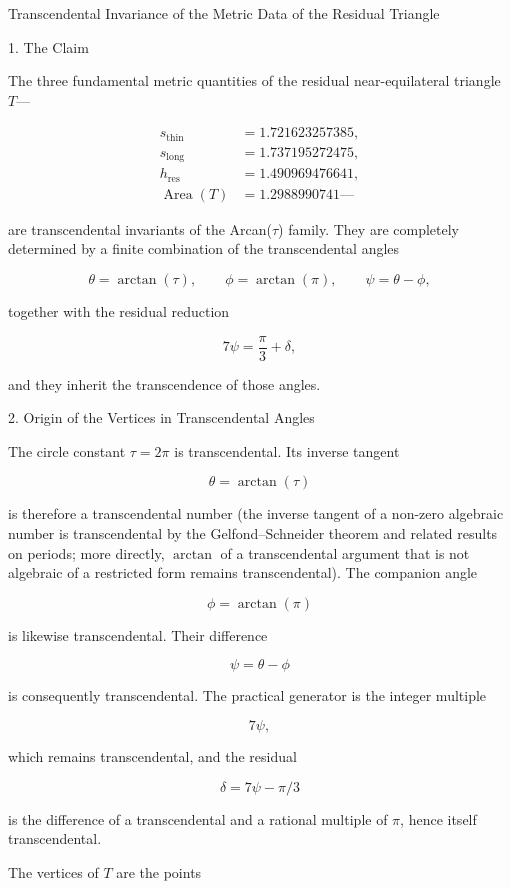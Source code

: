 Transcendental Invariance of the Metric Data of the Residual Triangle

1. The Claim

The three fundamental metric quantities of the residual near-equilateral triangle \(T\)—

\[
\begin{align*}
s_{\mathrm{thin}}&=1.721623257385,\\
s_{\mathrm{long}}&=1.737195272475,\\
h_{\mathrm{res}}&=1.490969476641,\\
\operatorname{Area}(T)&=1.2988990741—
\end{align*}
\]

are transcendental invariants of the Arcan(\(\tau\)) family. They are completely determined by a finite combination of the transcendental angles

\[
\theta=\arctan(\tau),\qquad
\phi=\arctan(\pi),\qquad
\psi=\theta-\phi,
\]

together with the residual reduction

\[
7\psi=\frac{\pi}{3}+\delta,
\]

and they inherit the transcendence of those angles.

2. Origin of the Vertices in Transcendental Angles

The circle constant \(\tau=2\pi\) is transcendental. Its inverse tangent

\[
\theta=\arctan(\tau)
\]

is therefore a transcendental number (the inverse tangent of a non-zero algebraic number is transcendental by the Gelfond–Schneider theorem and related results on periods; more directly, \(\arctan\) of a transcendental argument that is not algebraic of a restricted form remains transcendental). The companion angle

\[
\phi=\arctan(\pi)
\]

is likewise transcendental. Their difference

\[
\psi=\theta-\phi
\]

is consequently transcendental. The practical generator is the integer multiple

\[
7\psi,
\]

which remains transcendental, and the residual

\[
\delta=7\psi-\pi/3
\]

is the difference of a transcendental and a rational multiple of \(\pi\), hence itself transcendental.

The vertices of \(T\) are the points

